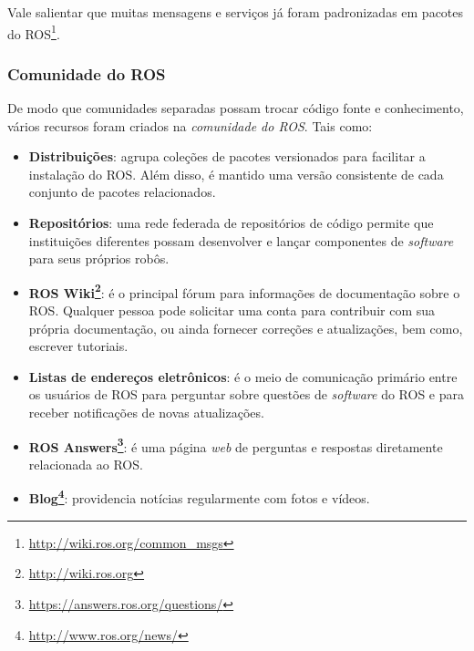                 Vale salientar que muitas mensagens e serviços já foram padronizadas em pacotes do ROS\footnote{\url{http://wiki.ros.org/common_msgs}}.
            
            \subsubsection{Comunidade do ROS} \label{subsubsec:ros_comunidade}
                De modo que comunidades separadas possam trocar código fonte e conhecimento, vários recursos foram criados na \textit{comunidade do ROS}. Tais como:
                
                \begin{itemize}
                    \item \textbf{Distribuições}: agrupa coleções de pacotes versionados para facilitar a instalação do ROS. Além disso, é mantido uma versão consistente de cada conjunto de pacotes relacionados.
                    
                    \item \textbf{Repositórios}: uma rede federada de repositórios de código permite que instituições diferentes possam desenvolver e lançar componentes de \textit{software} para seus próprios robôs.
                    
                    \item \textbf{ROS Wiki\footnote{\url{http://wiki.ros.org}}}: é o principal fórum para informações de documentação sobre o ROS. Qualquer pessoa pode solicitar uma conta para contribuir com sua própria documentação, ou ainda fornecer correções e atualizações, bem como, escrever tutoriais.
                    
                    \item \textbf{Listas de endereços eletrônicos}: é o meio de comunicação primário entre os usuários de ROS para perguntar sobre questões de \textit{software} do ROS e para receber notificações de novas atualizações.
                    
                    \item \textbf{ROS Answers\footnote{\url{https://answers.ros.org/questions/}}}: é uma página \textit{web} de perguntas e respostas diretamente relacionada ao ROS.
                    
                    \item \textbf{Blog\footnote{\url{http://www.ros.org/news/}}}: providencia notícias regularmente com fotos e vídeos.
                \end{itemize}
            
